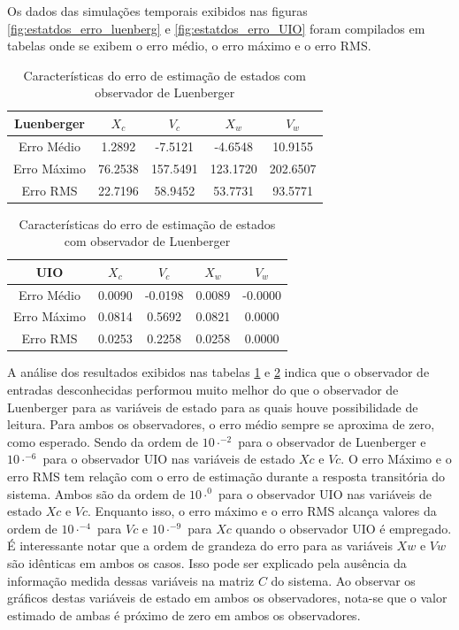 Os dados das simulações temporais exibidos nas figuras \ref{fig:estatdos_erro_luenberg} e \ref{fig:estatdos_erro_UIO} foram compilados em tabelas onde se exibem o erro médio, o erro máximo e o erro RMS.

\begin{table}[h!]
\footnotesize
\centering
    \begin{tabular}{|c|c|c|c|c|}
        \hline
        Luenberger & $X_c$& $V_c$& $X_w$& $V_w$\\
        \hline
        \hline
         Erro Médio&  1.2892&   -7.5121&   -4.6548&   10.9155\\ 
         Erro Máximo& 76.2538&  157.5491&  123.1720&  202.6507\\ 
         Erro RMS&    22.7196&   58.9452&   53.7731&   93.5771\\
        \hline
    \end{tabular} \label{tb:comparacao_erro_estado_LUE}\caption{Características do erro de estimação de estados com observador de Luenberger}
\end{table}

\begin{table}[h!]
\footnotesize
\centering
    \begin{tabular}{|c|c|c|c|c|}
        \hline
        UIO & $X_c$& $V_c$& $X_w$& $V_w$\\
        \hline
        \hline
         Erro Médio&  0.0090&   -0.0198&    0.0089&   -0.0000\\ 
         Erro Máximo& 0.0814&    0.5692&    0.0821&    0.0000\\ 
         Erro RMS&    0.0253&    0.2258&    0.0258&    0.0000\\
        \hline
    \end{tabular} \label{tb:comparacao_erro_estados_UIO}\caption{Características do erro de estimação de estados com observador de Luenberger}
\end{table}

A análise dos resultados exibidos nas tabelas \ref{tb:comparacao_erro_estado_LUE} e \ref{tb:comparacao_erro_estados_UIO} indica que o observador de entradas desconhecidas performou muito melhor do que o observador de Luenberger para as variáveis de estado para as quais houve possibilidade de leitura. Para ambos os observadores, o erro médio sempre se aproxima de zero, como esperado. Sendo da ordem de $10\cdot^{-2}$ para o observador de Luenberger e $10\cdot^{-6}$ para o observador UIO nas variáveis de estado $Xc$ e $Vc$. O erro Máximo e o erro RMS tem relação com o erro de estimação durante a resposta transitória do sistema. Ambos são da ordem de $10\cdot^{0}$ para o observador UIO nas variáveis de estado $Xc$ e $Vc$. Enquanto isso, o erro máximo e o erro RMS alcança valores da ordem de $10\cdot^{-4}$ para $Vc$ e $10\cdot^{-9}$ para $Xc$ quando o observador UIO é empregado.
É interessante notar que a ordem de grandeza do erro para as variáveis $Xw$ e $Vw$ são idênticas em ambos os casos. Isso pode ser explicado pela ausência da informação medida dessas variáveis na matriz $C$ do sistema. Ao observar os gráficos destas variáveis de estado em ambos os observadores, nota-se que o valor estimado de ambas é próximo de zero em ambos os observadores.


